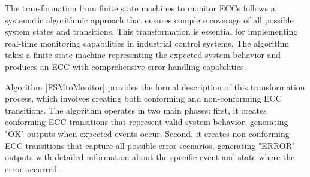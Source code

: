 The transformation from finite state machines to monitor ECCs follows a systematic algorithmic approach that ensures complete coverage of all possible system states and transitions. This transformation is essential for implementing real-time monitoring capabilities in industrial control systems. The algorithm takes a finite state machine representing the expected system behavior and produces an ECC with comprehensive error handling capabilities.

Algorithm \ref{FSMtoMonitor} provides the formal description of this transformation process, which involves creating both conforming and non-conforming ECC transitions. The algorithm operates in two main phases: first, it creates conforming ECC transitions that represent valid system behavior, generating "OK" outputs when expected events occur. Second, it creates non-conforming ECC transitions that capture all possible error scenarios, generating "ERROR" outputs with detailed information about the specific event and state where the error occurred.

